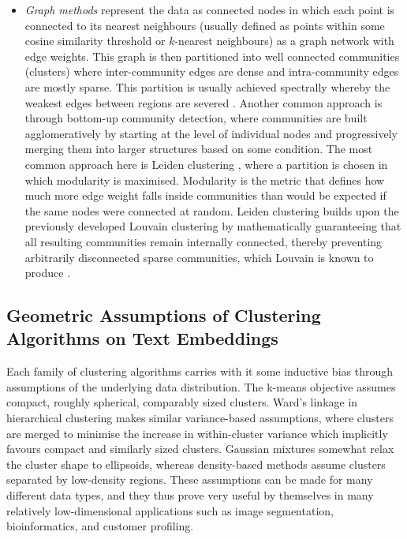 \documentclass[11pt,a4paper,oneside]{report}
\begin{document}
\begin{itemize}
\item \emph{Graph methods} represent the data as connected nodes in which each point is connected to its nearest neighbours (usually defined as points within some cosine similarity threshold or $k$-nearest neighbours) as a graph network with edge weights. This graph is then partitioned into well connected communities (clusters) where inter-community edges are dense and intra-community edges are mostly sparse. This partition is usually achieved spectrally whereby the weakest edges between regions are severed \citep{ng2002spectral,vonluxburg2007tutorial}. Another common approach is through bottom-up community detection, where communities are built agglomeratively by starting at the level of individual nodes and progressively merging them into larger structures based on some condition. The most common approach here is Leiden clustering \citep{traag2019leiden}, where a partition is chosen in which modularity is maximised. Modularity is the metric that defines how much more edge weight falls inside communities than would be expected if the same nodes were connected at random. Leiden clustering builds upon the previously developed Louvain clustering by mathematically guaranteeing that all resulting communities remain internally connected, thereby preventing arbitrarily disconnected sparse communities, which Louvain is known to produce \citep{blondel2008louvain}.
\end{itemize}

\subsection{Geometric Assumptions of Clustering Algorithms on Text Embeddings}\label{sec:assumptions}

Each family of clustering algorithms carries with it some inductive bias through assumptions of the underlying data distribution. The k-means objective assumes compact, roughly spherical, comparably sized clusters. Ward's linkage in hierarchical clustering makes similar variance-based assumptions, where clusters are merged to minimise the increase in within-cluster variance which implicitly favours compact and similarly sized clusters. Gaussian mixtures somewhat relax the cluster shape to ellipsoids, whereas density-based methods assume clusters separated by low-density regions. These assumptions can be made for many different data types, and they thus prove very useful by themselves in many relatively low-dimensional applications such as image segmentation, bioinformatics, and customer profiling.
\end{document}
